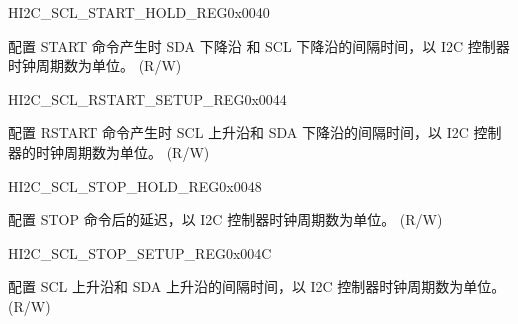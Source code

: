\begin{register}{H}{I2C\_SCL\_START\_HOLD\_REG}{0x0040}\label{regdesc:I2CSCLSTARTHOLDREG}
%
%
\regnewline%
\begin{regdesc}\begin{reglist}
\label{fielddesc:I2CSCLSTARTHOLDTIME}\item [I2C\_SCL\_START\_HOLD\_TIME] 配置 START 命令产生时 SDA 下降沿 和 SCL 下降沿的间隔时间，以 I2C 控制器时钟周期数为单位。 (R/W)
\end{reglist}\end{regdesc}
\end{register}


\begin{register}{H}{I2C\_SCL\_RSTART\_SETUP\_REG}{0x0044}\label{regdesc:I2CSCLRSTARTSETUPREG}
%
%
\regnewline%
\begin{regdesc}\begin{reglist}
\label{fielddesc:I2CSCLRSTARTSETUPTIME}\item [I2C\_SCL\_RSTART\_SETUP\_TIME] 配置 RSTART 命令产生时 SCL 上升沿和 SDA 下降沿的间隔时间，以 I2C 控制器的时钟周期数为单位。 (R/W)
\end{reglist}\end{regdesc}
\end{register}


\begin{register}{H}{I2C\_SCL\_STOP\_HOLD\_REG}{0x0048}\label{regdesc:I2CSCLSTOPHOLDREG}
%
%
\regnewline%
\begin{regdesc}\begin{reglist}
\label{fielddesc:I2CSCLSTOPHOLDTIME}\item [I2C\_SCL\_STOP\_HOLD\_TIME] 配置 STOP 命令后的延迟，以 I2C 控制器时钟周期数为单位。 (R/W)
\end{reglist}\end{regdesc}
\end{register}


\begin{register}{H}{I2C\_SCL\_STOP\_SETUP\_REG}{0x004C}\label{regdesc:I2CSCLSTOPSETUPREG}
%
%
\regnewline%
\begin{regdesc}\begin{reglist}
\label{fielddesc:I2CSCLSTOPSETUPTIME}\item [I2C\_SCL\_STOP\_SETUP\_TIME] 配置 SCL 上升沿和 SDA 上升沿的间隔时间，以 I2C 控制器时钟周期数为单位。 (R/W)
\end{reglist}\end{regdesc}
\end{register}


